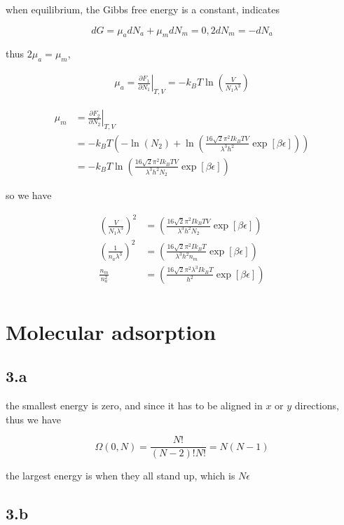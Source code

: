 \documentclass{article}
\begin{document}
when equilibrium, the Gibbs free energy is a constant, indicates

$$
dG = \mu_a dN_a + \mu_m dN_m = 0, 2dN_m = -dN_a
$$


thus $2\mu_a = \mu_m$, 

$$
\begin{aligned}
    \mu_a = \left.\frac{\partial F_1}{\partial N_1}\right|_{T, V} = -k_B T \ln(\frac{V}{N_1 \lambda^3})
\end{aligned}
$$

$$
\begin{aligned}
    \mu_m &= \left.\frac{\partial F_2}{\partial N_2}\right|_{T, V}\\
    &= -k_B T (-\ln(N_2) + \ln(\frac{16\sqrt{2}\pi^2 I k_B T V}{\lambda^3 h^2} \exp[\beta\epsilon]))\\
    &= -k_B T \ln(\frac{16\sqrt{2}\pi^2 I k_B T V}{\lambda^3 h^2 N_2} \exp[\beta\epsilon])
\end{aligned}
$$

so we have

$$
\begin{aligned}
    (\frac{V}{N_1 \lambda^3})^2 &= (\frac{16\sqrt{2}\pi^2 I k_B T V}{\lambda^3 h^2 N_2} \exp[\beta\epsilon])\\
    (\frac{1}{n_a \lambda^3})^2 &= (\frac{16\sqrt{2}\pi^2 I k_B T}{\lambda^3 h^2 n_m} \exp[\beta\epsilon])\\
    \frac{n_m}{n_a^2} &= (\frac{16\sqrt{2}\pi^2 \lambda^3 I k_B T}{h^2} \exp[\beta\epsilon])\\
\end{aligned}
$$

\section*{Molecular adsorption}

\subsection*{3.a}

the smallest energy is zero, and since it has to be aligned in $x$ or $y$ directions, thus we have

$$
\Omega(0, N) = \frac{N!}{(N-2)! N!} = N(N-1)
$$

the largest energy is when they all stand up, which is $N\epsilon$

\subsection*{3.b}
\end{document}

